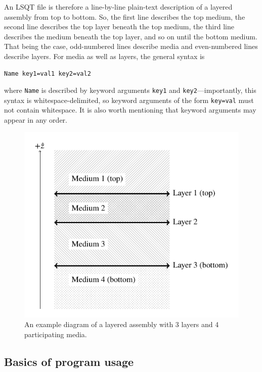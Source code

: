 \documentclass[
    twoside,
    twocolumn,
    letterpaper,
    10pt]{article}
\begin{document}
An LSQT file is therefore a line-by-line plain-text description of a 
layered assembly from top to bottom. So, the first line describes the 
top medium, the second line describes the top layer beneath the top medium, 
the third line describes the medium beneath the top layer, and so on until 
the bottom medium. 
That being the case, odd-numbered lines describe media
and even-numbered lines describe layers. For media as well as layers, 
the general syntax is 
\begin{verbatim}
Name key1=val1 key2=val2
\end{verbatim}
where \texttt{Name} is described by keyword arguments 
\texttt{key1} and \texttt{key2}---importantly, this syntax is
whitespace-delimited, so keyword arguments of the form \texttt{key=val} 
must not contain whitespace. It is also worth mentioning that 
keyword arguments may appear in any order.

\begin{figure}
\begin{center}
    \includegraphics[width=\columnwidth]{Fig-layers/Fig-layers.pdf}
    \caption{An example diagram of a layered assembly with 3 layers
    and 4 participating media.
    \label{fig:assembly}}
\end{center}
\end{figure}

\subsection{Basics of program usage}
\end{document}

